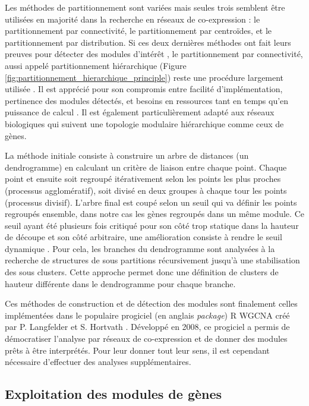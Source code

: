 Les méthodes de partitionnement sont variées mais seules trois semblent être utilisées en majorité dans la recherche en réseaux de co-expression : le partitionnement par connectivité, le partitionnement par centroïdes, et le partitionnement par distribution. Si ces deux dernières méthodes ont fait leurs preuves pour détecter des modules d'intérêt \cite{Ruan2006Dec,Shi2010Dec, Rau2018}, le partitionnement par connectivité, aussi appelé partitionnement hiérarchique (Figure \ref{fig:partitionnement_hierarchique_principle}) reste une procédure largement utilisée \cite{Tang2018, Mao2009, Rotival2013}. Il est apprécié pour son compromis entre facilité d'implémentation, pertinence des modules détectés, et besoins en ressources tant en temps qu'en puissance de calcul \cite{Saelens2018}. Il est également particulièrement adapté aux réseaux biologiques qui suivent une topologie modulaire hiérarchique comme ceux de gènes. 

La méthode initiale \cite{Murtagh2012Jan} consiste à construire un arbre de distances (un dendrogramme) en calculant un critère de liaison entre chaque point. Chaque point et ensuite soit regroupé itérativement selon les points les plus proches (processus agglomératif), soit divisé en deux groupes à chaque tour les points (processus divisif). L'arbre final est coupé selon un seuil qui va définir les points regroupés ensemble, dans notre cas les gènes regroupés dans un même module. Ce seuil ayant été plusieurs fois critiqué pour son côté trop statique dans la hauteur de découpe et son côté arbitraire, une amélioration consiste à rendre le seuil dynamique \cite{Langfelder2008_cutree}. Pour cela, les branches du dendrogramme sont analysées à la recherche de structures de sous partitions récursivement jusqu'à une stabilisation des sous clusters. Cette approche permet donc une définition de clusters de hauteur différente dans le dendrogramme pour chaque branche.

Ces méthodes de construction et de détection des modules sont finalement celles implémentées dans le populaire progiciel (en anglais \textit{package}) R WGCNA créé par P. Langfelder et S. Hortvath \cite{Langfelder2008}. Développé en 2008, ce progiciel a permis de démocratiser l'analyse par réseaux de co-expression et de donner des modules prêts à être interprétés. Pour leur donner tout leur sens, il est cependant nécessaire d'effectuer des analyses supplémentaires.



\subsection{Exploitation des modules de gènes}

